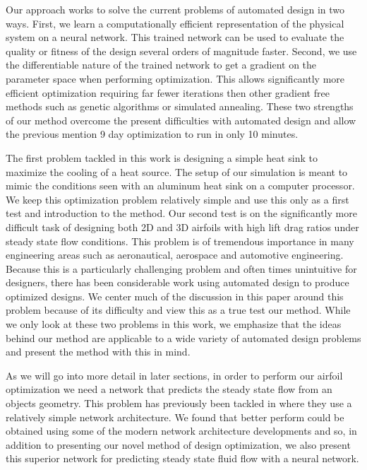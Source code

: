 \documentclass{article} %
\begin{document}
Our approach works to solve the current problems of automated design in two ways. First, we learn a computationally efficient representation of the physical system on a neural network. This trained network can be used to evaluate the quality or fitness of the design several orders of magnitude faster. Second, we use the differentiable nature of the trained network to get a gradient on the parameter space when performing optimization. This allows significantly more efficient optimization requiring far fewer iterations then other gradient free methods such as genetic algorithms or simulated annealing. These two strengths of our method overcome the present difficulties with automated design and allow the previous mention 9 day optimization to run in only 10 minutes. 

The first problem tackled in this work is designing a simple heat sink to maximize the cooling of a heat source. The setup of our simulation is meant to mimic the conditions seen with an aluminum heat sink on a computer processor. We keep this optimization problem relatively simple and use this only as a first test and introduction to the method. Our second test is on the significantly more difficult task of designing both 2D and 3D airfoils with high lift drag ratios under steady state flow conditions. This problem is of tremendous importance in many engineering areas such as aeronautical, aerospace and automotive engineering. Because this is a particularly challenging problem and often times unintuitive for designers, there has been considerable work using automated design to produce optimized designs. We center much of the discussion in this paper around this problem because of its difficulty and view this as a true test our method. While we only look at these two problems in this work, we emphasize that the ideas behind our method are applicable to a wide variety of automated design problems and present the method with this in mind.

As we will go into more detail in later sections, in order to perform our airfoil optimization we need a network that predicts the steady state flow from an objects geometry. This problem has previously been tackled in \citep{guo2016convolutional} where they use a relatively simple network architecture. We found that better perform could be obtained using some of the modern network architecture developments and so, in addition to presenting our novel method of design optimization, we also present this superior network for predicting steady state fluid flow with a neural network.
\end{document}
